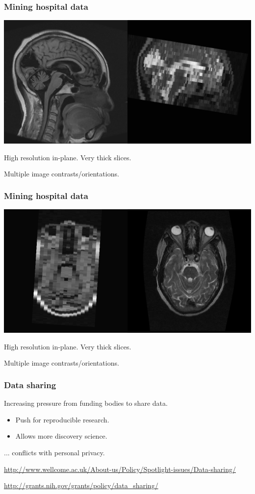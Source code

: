 \begin{frame}
\frametitle{Mining hospital data}
\includegraphics[width=\textwidth]{clinical_sag}

High resolution in-plane. Very thick slices.\par
Multiple image contrasts/orientations.\par
\end{frame}

\begin{frame}
\frametitle{Mining hospital data}
\includegraphics[width=\textwidth]{clinical_tra}

High resolution in-plane. Very thick slices.\par
Multiple image contrasts/orientations.\par
\end{frame}

\begin{frame}
\frametitle{Data sharing}
Increasing pressure from funding bodies to share data.
\begin{itemize}
\item Push for reproducible research.
\item Allows more discovery science.
\end{itemize}
... conflicts with personal privacy.

\vspace{0.25cm}
\begin{tiny}
\url{http://www.wellcome.ac.uk/About-us/Policy/Spotlight-issues/Data-sharing/}\par
\url{http://grants.nih.gov/grants/policy/data_sharing/}\par
\end{tiny}
\end{frame}

